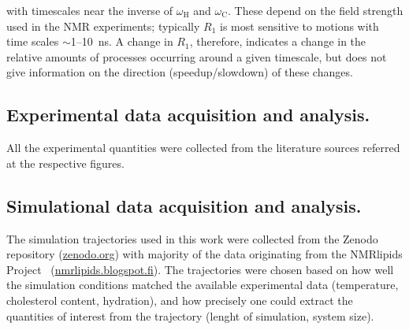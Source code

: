 \documentclass[journal=jcisd8,manuscript=article,layout=twocolumn]{achemso}
\begin{document}
with timescales near the inverse of $\omega_{\mathrm{H}}$ and $\omega_{\mathrm{C}}$.
These depend on the field strength used in the NMR experiments; typically
$R_1$ is most sensitive to motions with time scales $\sim$1--10~ns.
A change in $R_{1}$, therefore, indicates a change in the relative amounts of processes
occurring around a given timescale, but does not give information on the direction (speedup/slowdown) of these changes.

\subsection*{Experimental data acquisition and analysis.}
%
All the experimental quantities were collected from the literature sources referred at the respective figures.   

\subsection*{Simulational data acquisition and analysis.}
%
The simulation trajectories used in this work were collected from the Zenodo repository (\url{zenodo.org}) with majority of the data originating from the NMRlipids Project~\cite{botan15,catte16} (\url{nmrlipids.blogspot.fi}). The trajectories were chosen based on how well the simulation conditions matched the available experimental data (temperature, cholesterol content, hydration), and how precisely one could extract the quantities of interest from the trajectory (lenght of simulation, system size).
\end{document}
